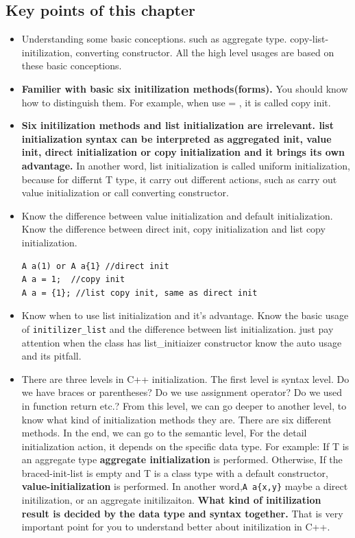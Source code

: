 \documentclass[a4paper,11pt,twoside]{book}
\begin{document}
\subsection{Key points of this chapter}
\begin{itemize}
	\item Understanding some basic conceptions. such as aggregate type. copy-list-initilization, converting constructor. All the high level usages are based on these basic conceptions. 
	
	\item \textbf{Familier with basic six initilization methods(forms).} You should know how to distinguish them. For example, when use = , it is called copy init. 
	
	\item \textbf{Six initilization methods and list initialization are irrelevant. list initialization syntax can be interpreted as aggregated init, value init, direct initialization or copy initialization and it brings its own advantage.}  In another word, list initialization is called uniform initialization, because for differnt T type, it carry out different actions, such as carry out value initialization or call converting constructor.
	
	\item Know the difference between value initialization and default initialization. Know the difference between direct init, copy initialization and list copy initialization.  
\begin{lstlisting}
A a(1) or A a{1} //direct init
A a = 1;  //copy init
A a = {1}; //list copy init, same as direct init	
\end{lstlisting}	
		 
	\item Know when to use list initialization and it's advantage. Know the basic usage of \texttt{initilizer\_list} and the difference between list initialization. just pay attention when the class has list\_initiaizer constructor know the auto usage and its pitfall.
	
	
	\item There are three levels in C++ initialization. The first level is syntax level. Do we have braces or parentheses? Do we use assignment operator? Do we used in function return  etc.? From this level, we can go deeper to another level, to know what kind of initialization methods they are. There are six different methods. In the end, we can go to the semantic level, For the detail initialization action,  it depends on the specific data type. For example: If T is an aggregate type \textbf{aggregate initialization} is performed. Otherwise, If the braced-init-list is empty and T is a class type with a default constructor, \textbf{value-initialization} is performed. In another word,\texttt{A a\{x,y\}} maybe a direct initilization, or an aggregate initilizaiton. \textbf{What kind of initilization result is decided by the data type and syntax together.} That is very important point for you to understand better about initilization in C++.
	

\end{itemize}
\end{document}
